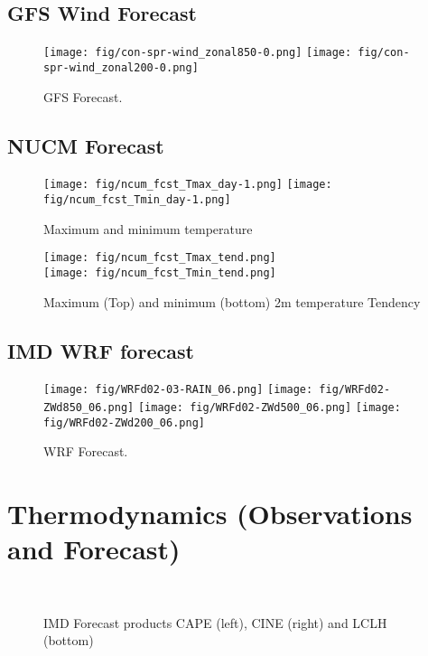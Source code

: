 \documentclass[10pt,a4paper]{article} %
\begin{document}
\subsection{GFS Wind Forecast}

\begin{figure}[H]
\centering
\texttt{[image: fig/con-spr-wind\_zonal850-0.png]}
\texttt{[image: fig/con-spr-wind\_zonal200-0.png]}
\caption{GFS Forecast.}
\end{figure}




\subsection{NUCM Forecast}
\begin{figure}[H]
\centering
\texttt{[image: fig/ncum\_fcst\_Tmax\_day-1.png]}
\texttt{[image: fig/ncum\_fcst\_Tmin\_day-1.png]}
\caption{Maximum and minimum temperature}
\end{figure}


\begin{figure}[H]
\centering
\texttt{[image: fig/ncum\_fcst\_Tmax\_tend.png]}\\
\vskip 0.5cm
\texttt{[image: fig/ncum\_fcst\_Tmin\_tend.png]}
\caption{Maximum (Top) and minimum (bottom) 2m temperature Tendency}
\end{figure}



\subsection{IMD WRF forecast}

\begin{figure}[H]
\centering
\texttt{[image: fig/WRFd02-03-RAIN\_06.png]}
\texttt{[image: fig/WRFd02-ZWd850\_06.png]}
\texttt{[image: fig/WRFd02-ZWd500\_06.png]}
\texttt{[image: fig/WRFd02-ZWd200\_06.png]}
\caption{WRF Forecast.}
\end{figure}







\section{Thermodynamics (Observations and Forecast) }
\begin{figure}[H]
\centering
{} \hskip 0.1cm
%
\\
\vskip 0.1cm
\caption{IMD Forecast products CAPE (left), CINE (right) and  LCLH (bottom)}
\end{figure}
\end{document}
